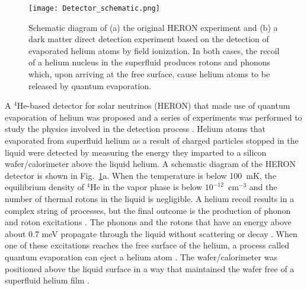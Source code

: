 \documentclass[10pt, letterpaper, reprint, superscriptaddress, aps, prl]
{revtex4-1} \usepackage[latin1]{inputenc}
\begin{document}


\begin{figure}[!h]
\centering\texttt{[image: Detector\_schematic.png]}
\caption{Schematic diagram of (a) the original HERON experiment and (b) a dark matter direct detection experiment based on the detection of evaporated helium atoms by field ionization.  In both cases, the recoil of a helium nucleus in the superfluid produces rotons and phonons which, upon arriving at the free surface, cause helium atoms to be released by quantum evaporation.} 
\label{fig:schematic}
\end{figure}

A $^4$He-based detector for solar neutrinos (HERON) that made use of quantum evaporation of helium was proposed \cite{Lanou1987} and a series of experiments was performed to study the physics involved in the detection process \cite{Bandler1992,Bandler1995}.
Helium atoms that evaporated from superfluid helium as a result of charged particles stopped in the liquid \cite{Lanou1987,Bandler1992,Enss1994,Bandler1995,Adams1998,Adams2000} were detected by measuring the energy they imparted to a silicon wafer/calorimeter above the liquid helium.
A schematic diagram of the HERON detector is shown in Fig.~\ref{fig:schematic}a.
When the temperature is below 100~mK, the equilibrium density of $^4$He in the vapor phase is below $10^{-12}$~cm$^{-3}$ and the number of thermal rotons in the liquid is negligible.
A helium recoil results in a complex string of processes, but the final outcome is the production of phonon and roton excitations \cite{Maris1977}.
The phonons and the rotons that have an energy above about 0.7 meV propagate through the liquid without scattering or decay \cite{NoteLosses}.
When one of these excitations reaches the free surface of the helium, a process called quantum evaporation can eject a helium atom \cite{Brown1990,Wyatt1992,Balibar2016}.
The wafer/calorimeter was positioned above the liquid surface in a way that maintained the wafer free of a superfluid helium film \cite{Torii1992}.%
\end{document}
